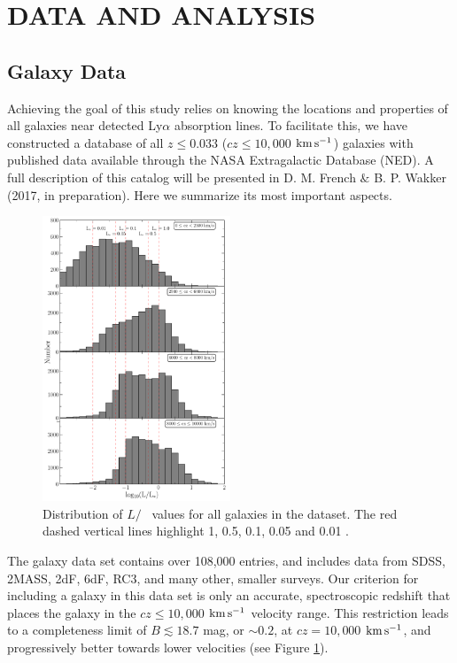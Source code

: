 \section{DATA AND ANALYSIS}

\subsection{Galaxy Data}
Achieving the goal of this study relies on knowing the locations and properties of all galaxies near detected Ly$\alpha$ absorption lines. To facilitate this, we have constructed a database of all $z\leq 0.033$ ($cz\leq 10,000$ $\rm km\, s^{-1}$) galaxies with published data available through the NASA Extragalactic Database (NED). A full description of this catalog will be presented in D. M. French $\&$ B. P. Wakker (2017, in preparation). Here we summarize its most important aspects.

\begin{figure}[b!]
        \centering
        \vspace{0pt}
        \includegraphics[width=0.50\textwidth]{Chap3/figures/fig1.pdf}
        \caption{\small{Distribution of $L/$\Lstar~ values for all galaxies in the dataset. The red dashed vertical lines highlight 1, 0.5, 0.1, 0.05 and 0.01 \Lstar.}}
        \label{completeness}
\end{figure} 

The galaxy data set contains over 108,000 entries, and includes data from SDSS, 2MASS, 2dF, 6dF, RC3, and many other, smaller surveys. Our criterion for including a galaxy in this data set is only an accurate, spectroscopic redshift that places the galaxy in the $cz \leq 10,000$ $\rm km\, s^{-1}$ velocity range. This restriction leads to a completeness limit of $B \lesssim 18.7$ mag, or $\sim0.2 $\Lstar, at $cz = 10,000$ $\rm km\, s^{-1}$, and progressively better towards lower velocities (see Figure \ref{completeness}). 

